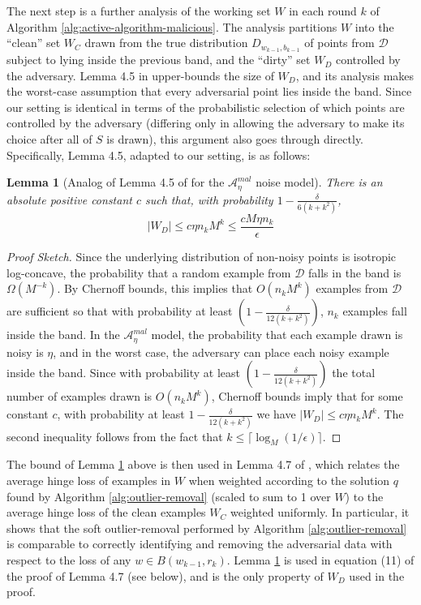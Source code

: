 \documentclass[11pt]{article}
\newtheorem{lemma}[theorem]{Lemma}
\newcommand{\0}{\mathbf{0}}
\newcommand{\1}{\mathbf{1}}
\newcommand{\cA}{\mathcal{A}}
\newcommand{\cD}{\mathcal{D}}
\begin{document}
The next step is a further analysis of the working set $W$ in each round $k$ of Algorithm \ref{alg:active-algorithm-malicious}.  The analysis partitions $W$ into the ``clean'' set $W_C$ drawn from the true distribution $D_{w_{k-1}, b_{k-1}}$ of points from $\cD$ subject to lying inside the previous band, and the ``dirty'' set $W_D$ controlled by the adversary.  Lemma 4.5 in \cite{awasthi2017power} upper-bounds the size of $W_D$, and its analysis makes the worst-case assumption that every adversarial point lies inside the band.  Since our setting is identical in terms of the probabilistic selection of which points are controlled by the adversary (differing only in allowing the adversary to make its choice after all of $S$ is drawn), this argument also goes through directly. Specifically, Lemma 4.5, adapted to our setting, is as follows:

\begin{lemma}[Analog of Lemma 4.5 of \cite{awasthi2017power} for the $\cA^{mal}_\eta$ noise model]
\label{lemma:few.noisy}
There is an absolute positive constant $c$ such that, with
probability $1 - \frac{\delta}{6 (k+k^2)}$,
\begin{equation}
\label{e:few.noisy}
|W_D| \leq c \eta n_k {M}^k \leq \frac{ c M \eta n_k}{\epsilon}
\end{equation}
\end{lemma}
\begin{proof}[Proof Sketch]
Since the underlying distribution of non-noisy points is isotropic log-concave, the
probability that a random example from $\cD$ falls in the band is
$\Omega(M^{-k})$.  By Chernoff bounds, this implies that $O({n_k {M}^k})$ examples from $\cD$ are sufficient so that with probability at least $(1 - \frac{\delta}{12 (k+k^2)})$,
$n_k$ examples fall inside the band. In the $\cA^{mal}_\eta$ model, the probability that each example drawn
is noisy is $\eta$, and in the worst case, the adversary can place each noisy example inside the band. Since with probability at least $(1 - \frac{\delta}{12 (k+k^2)})$ the total number of examples drawn is $O({n_k {M}^k})$, Chernoff bounds imply that for some constant $c$, with
probability at least $1 - \frac{\delta}{12 (k+k^2)}$ we have
$|W_D| \leq c \eta n_k M^k$.  The second inequality follows from the fact that $k \leq \lceil \log_M (1/\epsilon) \rceil$.
\end{proof}

The bound of Lemma \ref{lemma:few.noisy} above is then used in Lemma 4.7 of \cite{awasthi2017power}, which relates the average hinge loss of examples in $W$ when weighted according to the solution $q$ found by Algorithm \ref{alg:outlier-removal} (scaled to sum to 1 over $W$) to the average hinge loss of the clean examples $W_C$ weighted uniformly. In particular, it shows that the soft outlier-removal performed by Algorithm \ref{alg:outlier-removal} is comparable to correctly identifying and removing the adversarial data with respect to the loss of any $w \in B({w}_{k-1},r_k)$. Lemma \ref{lemma:few.noisy} is used in equation (11) of the proof of Lemma 4.7 (see below), and is the only property of $W_D$ used in the proof.
\end{document}
